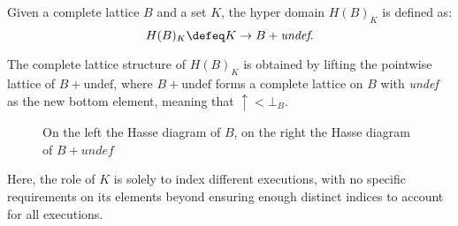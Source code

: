 \begin{definition}
  Given a complete lattice $B$ and a set $K$, the hyper domain $H(B)_K$ is
  defined as: $$H(B)_K \defeq K \to B + \textit{undef}.$$

  The complete lattice structure of $H(B)_K$ is obtained by lifting the
  pointwise lattice of $B + \text{undef}$, where $B + \text{undef}$ forms a
  complete lattice on $B$ with \textit{undef} as the new bottom element,
  meaning that $\uparrow < \bot_B$.
\end{definition}

\begin{figure}[H]
\begin{center}
\qquad
\qquad
\qquad
{}
\end{center}
\caption{On the left the Hasse diagram of $B$, on the right the Hasse diagram of
$B + undef$}
\end{figure}

Here, the role of $K$ is solely to index different executions, with no specific
requirements on its elements beyond ensuring enough distinct indices to account
for all executions.

